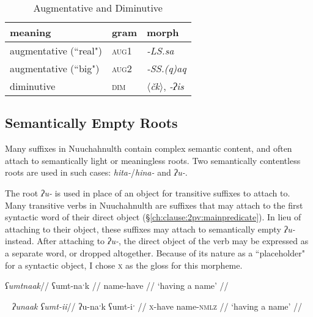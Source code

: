 \begin{table}[ht]
\centering
\caption{Augmentative and Diminutive}
\label{table:augdim}
\begin{tabular}{lll}
meaning                            & gram               & morph                                         \\ \hline
\multicolumn{1}{|l|}{augmentative (``real")} & \multicolumn{1}{l|}{\textsc{aug1}}   & \multicolumn{1}{l|}{\textit{-LS.sa}}                   \\ \hline
\multicolumn{1}{|l|}{augmentative (``big")} & \multicolumn{1}{l|}{\textsc{aug2}}   & \multicolumn{1}{l|}{\textit{-SS.(q)aq}}                   \\ \hline
\multicolumn{1}{|l|}{diminutive}   & \multicolumn{1}{l|}{\textsc{dim}} & \multicolumn{1}{l|}{\textit{$\langle$čk$\rangle$}, \textit{-ʔis}} \\ \hline
\end{tabular}
\end{table}

\subsection{Semantically Empty Roots} \label{sec:empty}

Many suffixes in Nuuchahnulth contain complex semantic content, and often attach to semantically light or meaningless roots. Two semantically contentless roots are used in such cases: \textit{hita-}/\textit{hina-} and \textit{ʔu-}.

The root \textit{ʔu-} is used in place of an object for transitive suffixes to attach to. Many transitive verbs in Nuuchahnulth are suffixes that may attach to the first syntactic word of their direct object (\S\ref{ch:clause:2pv:mainpredicate}). In lieu of attaching to their object, these suffixes may attach to semantically empty \textit{ʔu-} instead. After attaching to \textit{ʔu-}, the direct object of the verb may be expressed as a separate word, or dropped altogether. Because of its nature as a ``placeholder" for a syntactic object, I chose \textsc{x} as the gloss for this morpheme.

\ex \label{havename1}
\begingl
\glpreamble \textit{ʕumtnaak}//
\gla ʕumt-naˑk //
\glb name-have //
\glft `having a name' //
\endgl
\xe

\ex~ \label{havename2}
\begingl
\glpreamble \textit{ʔunaak ʕumt-ii}//
\gla ʔu-naˑk ʕumt-iˑ //
\glb \textsc{x}-have name-\textsc{nmlz} //
\glft `having a name' //
\endgl
\xe

